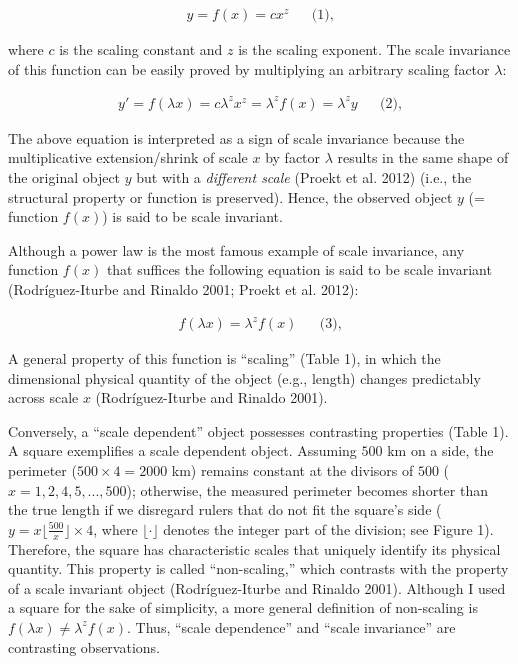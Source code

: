 \documentclass[
  12pt,
]{article}
\begin{document}
\[
\begin{aligned}
y = f(x) = cx^z &&\text{(1),}
\end{aligned}
\]

where \(c\) is the scaling constant and \(z\) is the scaling exponent. The scale invariance of this function can be easily proved by multiplying an arbitrary scaling factor \(\lambda\):

\[
\begin{aligned}
y'=f(\lambda x)=c\lambda^zx^z = \lambda^z f(x) = \lambda^z y  &&\text{(2),}
\end{aligned}
\]

The above equation is interpreted as a sign of scale invariance because the multiplicative extension/shrink of scale \(x\) by factor \(\lambda\) results in the same shape of the original object \(y\) but with a \emph{different scale} (Proekt et al. 2012) (i.e., the structural property or function is preserved). Hence, the observed object \(y\) (= function \(f(x)\)) is said to be scale invariant.

Although a power law is the most famous example of scale invariance, any function \(f(x)\) that suffices the following equation is said to be scale invariant (Rodríguez-Iturbe and Rinaldo 2001; Proekt et al. 2012):

\[
\begin{aligned}
f(\lambda x) = \lambda^z f(x) &&\text{(3),}
\end{aligned}
\]

A general property of this function is ``scaling'' (Table 1), in which the dimensional physical quantity of the object (e.g., length) changes predictably across scale \(x\) (Rodríguez-Iturbe and Rinaldo 2001).

Conversely, a ``scale dependent'' object possesses contrasting properties (Table 1). A square exemplifies a scale dependent object. Assuming \(500\) km on a side, the perimeter (\(500 \times 4 =2000\) km) remains constant at the divisors of \(500\) (\(x = 1, 2, 4, 5,...,500\)); otherwise, the measured perimeter becomes shorter than the true length if we disregard rulers that do not fit the square's side (\(y = x \lfloor \frac{500}{x} \rfloor \times 4\), where \(\lfloor \cdot \rfloor\) denotes the integer part of the division; see Figure 1). Therefore, the square has characteristic scales that uniquely identify its physical quantity. This property is called ``non-scaling,'' which contrasts with the property of a scale invariant object (Rodríguez-Iturbe and Rinaldo 2001). Although I used a square for the sake of simplicity, a more general definition of non-scaling is \(f(\lambda x) \ne \lambda^zf(x)\). Thus, ``scale dependence'' and ``scale invariance'' are contrasting observations.
\end{document}
